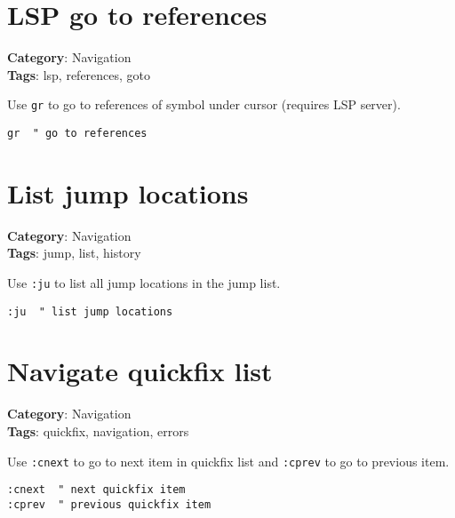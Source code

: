 {{{{{{{{{{\section{LSP go to references}

\textbf{Category}: Navigation\\ \textbf{Tags}: lsp, references, goto
\vspace{0.5cm}

Use {\footnotesize \Verb§gr§} to go to references of symbol under cursor (requires LSP server).

\begin{Exa*}{}
\begin{Verbatim}[fontsize=\footnotesize, breaklines, breakanywhere]
gr  " go to references
\end{Verbatim}
\end{Exa*}

\section{List jump locations}

\textbf{Category}: Navigation\\ \textbf{Tags}: jump, list, history
\vspace{0.5cm}

Use {\footnotesize \Verb§:ju§} to list all jump locations in the jump list.

\begin{Exa*}{}
\begin{Verbatim}[fontsize=\footnotesize, breaklines, breakanywhere]
:ju  " list jump locations
\end{Verbatim}
\end{Exa*}

\section{Navigate quickfix list}

\textbf{Category}: Navigation\\ \textbf{Tags}: quickfix, navigation, errors
\vspace{0.5cm}

Use {\footnotesize \Verb§:cnext§} to go to next item in quickfix list and {\footnotesize \Verb§:cprev§} to go to previous item.

\begin{Exa*}{}
\begin{Verbatim}[fontsize=\footnotesize, breaklines, breakanywhere]
:cnext  " next quickfix item
:cprev  " previous quickfix item
\end{Verbatim}
\end{Exa*}

}}}}}}}}}}
